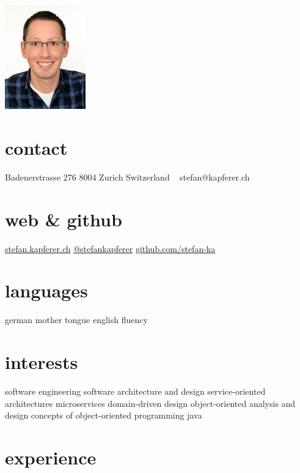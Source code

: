 \documentclass[]{cv-style}
\begin{document}


\begin{aside}
\includegraphics[width=3.5cm]{ska}
%
\section{contact}
Badenerstrasse 276
8004 Zurich
Switzerland
~
stefan@kapferer.ch
%
\section{web \& github}
\href{https://stefan.kapferer.ch}{stefan.kapferer.ch}
\href{https://twitter.com/stefankapferer}{@stefankapferer}
\href{https://github.com/stefan-ka}{github.com/stefan-ka}
%
\section{languages}
german mother tongue
english fluency
%
\section{interests}
software engineering\smallskip
software architecture and design\smallskip
service-oriented architectures\smallskip
microservices\smallskip
domain-driven design\smallskip
object-oriented analysis and design\smallskip
concepts of object-oriented programming\smallskip
java\smallskip
%
\end{aside}


\section{experience}
\end{document}
